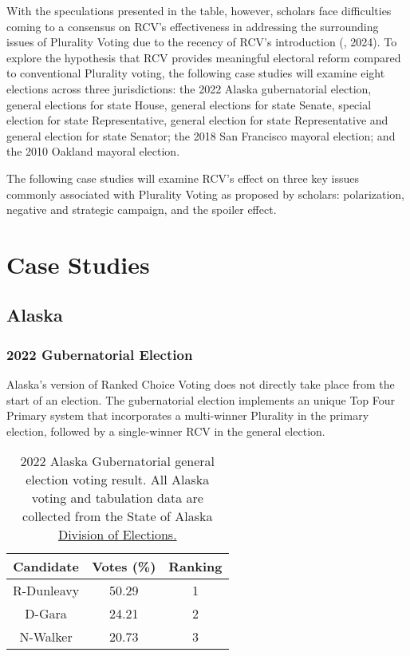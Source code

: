 With the speculations presented in the table, however, scholars face difficulties coming to a consensus on RCV’s effectiveness in addressing the surrounding issues of Plurality Voting due to the recency of RCV’s introduction (\cite{dowling2024}, 2024). To explore the hypothesis that RCV provides meaningful electoral reform compared to conventional Plurality voting, the following case studies will examine eight elections across three jurisdictions: the 2022 Alaska gubernatorial election, general elections for state House, general elections for state Senate, special election for state Representative, general election for state Representative and general election for state Senator; the 2018 San Francisco mayoral election; and the 2010 Oakland mayoral election. 

The following case studies will examine RCV’s effect on three key issues commonly associated with Plurality Voting as proposed by scholars: polarization, negative and strategic campaign, and the spoiler effect. 

\section{Case Studies}

\subsection{Alaska}

\subsubsection{2022 Gubernatorial Election}

Alaska's version of Ranked Choice Voting does not directly take place from the start of an election. The gubernatorial election implements an unique Top Four Primary system that incorporates a multi-winner Plurality in the primary election, followed by a single-winner RCV in the general election. 

\begin{table}[h!]
\centering
\begin{tabular}{|c | c | c |}
\hline
Candidate & Votes (\%) & Ranking \\ \hline
R-Dunleavy & 50.29 & 1 \\ \hline
D-Gara & 24.21 & 2 \\ \hline
N-Walker & 20.73 & 3 \\ \hline
\end{tabular}
\caption{2022 Alaska Gubernatorial general election voting result. All Alaska voting and tabulation data are collected from the State of Alaska \href{https://www.elections.alaska.gov/election-results/e/?id=22genr}{Division of Elections.}}
\label{tab:1}
\end{table}

